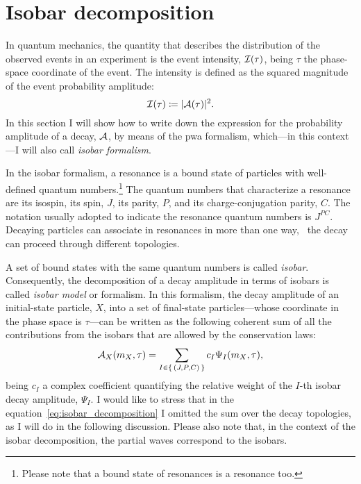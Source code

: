 \section{Isobar decomposition}

    In quantum mechanics, the quantity that describes the distribution of the observed events in an experiment is the event intensity, $\mathcal{I}(\tau)$, being $\tau$ the phase-space coordinate of the event.
    The intensity is defined as the squared magnitude of the event probability amplitude:
    \begin{equation}
        \mathcal{I}(\tau) \coloneqq \lvert\mathcal{A}(\tau)\rvert^2.
    \end{equation}
    In this section I will show how to write down the expression for the probability amplitude of a decay, $\mathcal{A}$, by means of the \ac{pwa} formalism, which---in this context---I will also call \emph{isobar formalism}.


    In the isobar formalism, a resonance is a bound state of particles with well-defined quantum numbers.\footnote{Please note that a bound state of resonances is a resonance too.}
    The quantum numbers that characterize a resonance are its isospin, its spin, $J$, its parity, $P$, and its charge-conjugation parity, $C$.
    The notation usually adopted to indicate the resonance quantum numbers is $J^{PC}$.
    Decaying particles can associate in resonances in more than one way, \ie~the decay can proceed through different topologies.


    A set of bound states with the same quantum numbers is called \emph{isobar}.
    Consequently, the decomposition of a decay amplitude in terms of isobars is called \emph{isobar model} or formalism.
    In this formalism, the decay amplitude of an initial-state particle, $X$, into a set of final-state particles---whose coordinate in the phase space is $\tau$---can be written as the following coherent sum of all the contributions from the isobars that are allowed by the conservation laws:
    \begin{equation}\label{eq:isobar_decomposition}
        \mathcal{A}_X(m_X,\tau) = \sum_{I\in\set{(J, P, C)}} c_I \Psi_I(m_X, \tau),
    \end{equation}
    being $c_I$ a complex coefficient quantifying the relative weight of the $I$-th isobar decay amplitude, $\Psi_I$.
    I would like to stress that in the equation~\eqref{eq:isobar_decomposition} I omitted the sum over the decay topologies, as I will do in the following discussion.
    Please also note that, in the context of the isobar decomposition, the partial waves correspond to the isobars.


